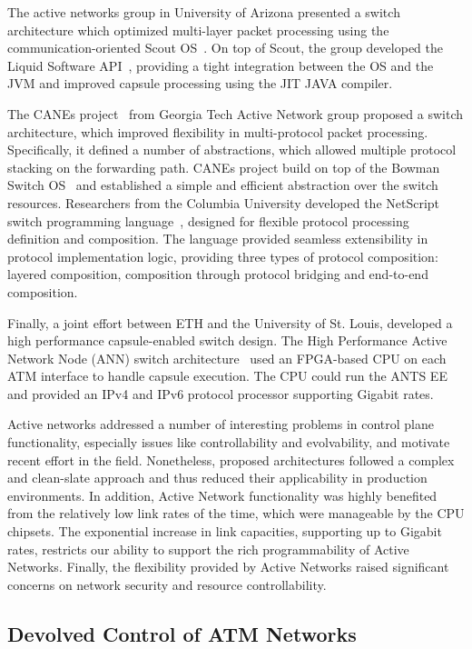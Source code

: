 The active networks group in University of Arizona presented a switch
architecture which optimized multi-layer packet processing using the
communication-oriented Scout OS~. On top of Scout, the group
developed the Liquid Software API~, providing a tight
integration between the OS and the JVM and improved capsule processing using
the JIT JAVA compiler. 

The CANEs project~ from Georgia Tech Active Network group
proposed a switch architecture, which improved flexibility in multi-protocol
packet processing. Specifically, it defined a number of abstractions, which
allowed multiple protocol stacking on the forwarding path. CANEs project build
on top of the Bowman Switch OS~ and established a simple and
efficient abstraction over the switch resources.  Researchers from the Columbia
University developed the NetScript switch programming
language~, designed for flexible protocol processing
definition and composition. The language provided seamless extensibility in
protocol implementation logic, providing three types of protocol composition:
layered composition, composition through protocol bridging and end-to-end
composition.

Finally, a joint effort between ETH and the University of St. Louis, developed a
high performance capsule-enabled switch design. The High Performance Active
Network Node (ANN) switch architecture~ used an FPGA-based
CPU on each ATM interface to handle capsule execution.  The CPU could run the
ANTS EE and provided an IPv4 and IPv6 protocol processor supporting Gigabit rates. 

Active networks addressed a number of interesting problems in control plane
functionality, especially issues like controllability and evolvability, and
motivate recent effort in the field.  Nonetheless, proposed architectures
followed a complex and clean-slate approach and thus reduced their applicability
in production environments. In addition, Active Network functionality was highly
benefited from the relatively low link rates of the time, which were manageable
by the CPU chipsets. The exponential increase in link capacities, supporting up
to Gigabit rates, restricts our ability to support the rich programmability of
Active Networks.  Finally, the flexibility provided by Active Networks raised
significant concerns on network security and resource controllability.  

\subsection{Devolved Control of ATM Networks}

